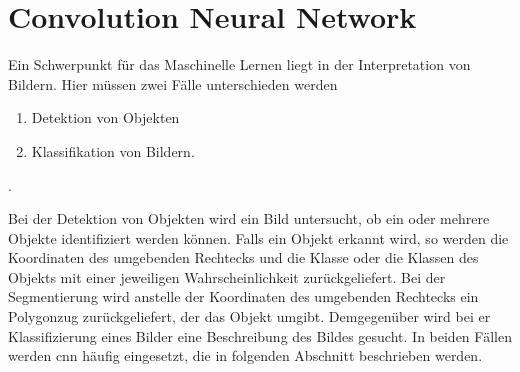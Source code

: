 %
%









\section{Convolution Neural Network}

Ein Schwerpunkt für das Maschinelle Lernen liegt in der Interpretation von Bildern. Hier müssen zwei Fälle unterschieden werden

\begin{enumerate}
    \item Detektion von Objekten
    \item Klassifikation von Bildern.
    
\end{enumerate}. 

Bei der Detektion von Objekten wird ein Bild untersucht, ob ein oder mehrere Objekte identifiziert werden können. Falls ein Objekt erkannt wird, so werden die Koordinaten des umgebenden Rechtecks und die Klasse  oder die Klassen des Objekts mit einer jeweiligen Wahrscheinlichkeit zurückgeliefert. Bei der Segmentierung wird anstelle der Koordinaten des umgebenden Rechtecks ein Polygonzug zurückgeliefert, der das Objekt umgibt. Demgegenüber wird bei er Klassifizierung eines Bilder eine Beschreibung des Bildes gesucht. In beiden Fällen werden \ac{cnn} häufig eingesetzt, die in folgenden Abschnitt beschrieben werden. 

